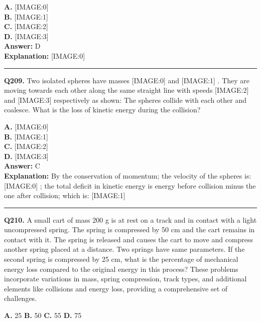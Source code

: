 \documentclass[12pt]{article}
\begin{document}
\textbf{A.} [IMAGE:0] \\
\textbf{B.} [IMAGE:1] \\
\textbf{C.} [IMAGE:2] \\
\textbf{D.} [IMAGE:3] \\

\textbf{Answer:} D \\
\textbf{Explanation:} [IMAGE:0]

\hrule
\vspace{1em}


\noindent
\textbf{Q209.} Two isolated spheres have masses
[IMAGE:0]
and
[IMAGE:1]
. They are moving towards each other along the same straight line with speeds
[IMAGE:2]
and
[IMAGE:3]
respectively as shown:
The spheres collide with each other and coalesce. What is the loss of kinetic energy during the collision?



\textbf{A.} [IMAGE:0] \\
\textbf{B.} [IMAGE:1] \\
\textbf{C.} [IMAGE:2] \\
\textbf{D.} [IMAGE:3] \\

\textbf{Answer:} C \\
\textbf{Explanation:} By the conservation of momentum; the velocity of the spheres is:
[IMAGE:0]
; the total deficit in kinetic energy is energy before collision minus the one after collision; which is:
[IMAGE:1]

\hrule
\vspace{1em}


\noindent
\textbf{Q210.} A small cart of mass 200 g is at rest on a track and in contact with a light uncompressed spring. The spring is compressed by 50 cm and the cart remains in contact with it. The spring is released and causes the cart to move and compress another spring placed at a distance. Two springs have same parameters. If the second spring is compressed by 25 cm, what is the percentage of mechanical energy loss compared to the original energy in this process?
These problems incorporate variations in mass, spring compression, track types, and additional elements like collisions and energy loss, providing a comprehensive set of challenges.



\textbf{A.} 25%
\textbf{B.} 50%
\textbf{C.} 55%
\textbf{D.} 75%
\end{document}
